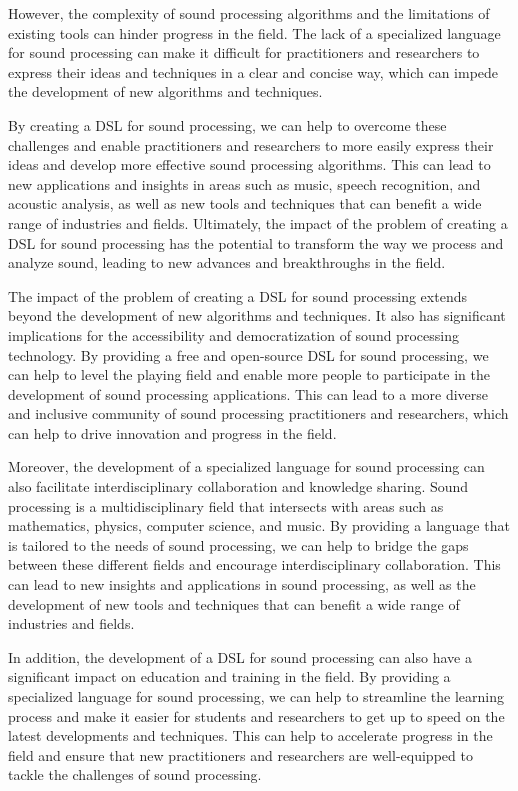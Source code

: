However, the complexity of sound processing algorithms and the limitations of existing tools can hinder progress in the field. The lack of a specialized language for sound processing can make it difficult for practitioners and researchers to express their ideas and techniques in a clear and concise way, which can impede the development of new algorithms and techniques.

By creating a DSL for sound processing, we can help to overcome these challenges and enable practitioners and researchers to more easily express their ideas and develop more effective sound processing algorithms. This can lead to new applications and insights in areas such as music, speech recognition, and acoustic analysis, as well as new tools and techniques that can benefit a wide range of industries and fields. Ultimately, the impact of the problem of creating a DSL for sound processing has the potential to transform the way we process and analyze sound, leading to new advances and breakthroughs in the field.

The impact of the problem of creating a DSL for sound processing extends beyond the development of new algorithms and techniques. It also has significant implications for the accessibility and democratization of sound processing technology. By providing a free and open-source DSL for sound processing, we can help to level the playing field and enable more people to participate in the development of sound processing applications. This can lead to a more diverse and inclusive community of sound processing practitioners and researchers, which can help to drive innovation and progress in the field.

Moreover, the development of a specialized language for sound processing can also facilitate interdisciplinary collaboration and knowledge sharing. Sound processing is a multidisciplinary field that intersects with areas such as mathematics, physics, computer science, and music. By providing a language that is tailored to the needs of sound processing, we can help to bridge the gaps between these different fields and encourage interdisciplinary collaboration. This can lead to new insights and applications in sound processing, as well as the development of new tools and techniques that can benefit a wide range of industries and fields.

In addition, the development of a DSL for sound processing can also have a significant impact on education and training in the field. By providing a specialized language for sound processing, we can help to streamline the learning process and make it easier for students and researchers to get up to speed on the latest developments and techniques. This can help to accelerate progress in the field and ensure that new practitioners and researchers are well-equipped to tackle the challenges of sound processing.

